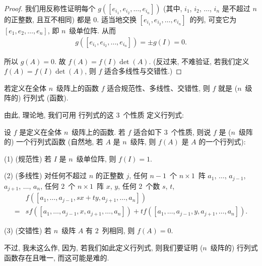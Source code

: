 \documentclass[../libro.tex]{subfiles}
\begin{document}
\begin{proof}
    我们用反称性证明每个
    \(g([e_{i_1}, e_{i_2}, \dots, e_{i_n}])\)
    (其中, \(i_1\), \(i_2\), \(\dots\), \(i_n\)
    是不超过 \(n\) 的正整数, 且互不相同)
    都是 \(0\).
    适当地交换
    \([e_{i_1}, e_{i_2}, \dots, e_{i_n}]\)~的列,
    可变它为 \([e_1, e_2, \dots, e_n]\),
    即 \(n\)~级单位阵.
    从而
    \begin{align*}
        g([e_{i_1}, e_{i_2}, \dots, e_{i_n}])
        = \pm g(I) = 0.
    \end{align*}

    所以 \(g(A) = 0\).
    故 \(f(A) = f(I) \det {(A)}\).
    (反过来, 不难验证, 若我们定义 %
    \(f(A) = f(I) \det {(A)}\),
    则 \(f\) 适合多线性与交错性.) %
\end{proof}

\begin{theorem}
    若定义在全体 \(n\)~级阵上的函数 \(f\)
    适合规范性、多线性、交错性,
    则 \(f\) 就是 (\(n\)~级阵的) 行列式 (函数).
\end{theorem}

由此, 理论地, 我们可用%
行列式的这 \(3\)~个性质%
定义行列式:

\begin{definition}
    设 \(f\) 是定义在全体 \(n\)~级阵上的函数.
    若 \(f\) 适合如下 \(3\)~个性质, 则说
    \(f\) 是 (\(n\)~级阵的) 一个行列式函数
    (自然地, 若 \(A\) 是 \(n\)~级阵,
    则 \(f(A)\) 是 \(A\) 的一个行列式):

    (1)
    (规范性)
    若 \(I\) 是 \(n\)~级单位阵,
    则 \(f(I) = 1\).

    (2)
    (多线性)
    对任何不超过 \(n\) 的正整数 \(j\),
    任何 \(n-1\)~个 \(n \times 1\)~阵
    \(a_1\), \(\dots\), \(a_{j-1}\),
    \(a_{j+1}\), \(\dots\), \(a_n\),
    任何 \(2\)~个 \(n \times 1\)~阵 \(x\), \(y\),
    任何 \(2\)~个数 \(s\), \(t\),
    \begin{align*}
        &
        f([a_1, \dots, a_{j-1}, sx + ty, a_{j+1}, \dots, a_n])
        \\
        = {} &
        s f([a_1, \dots, a_{j-1}, x, a_{j+1}, \dots, a_n])
        + t f([a_1, \dots, a_{j-1}, y, a_{j+1}, \dots, a_n]).
    \end{align*}

    (3)
    (交错性)
    若 \(n\)~级阵 \(A\) 有 \(2\)~列相同,
    则 \(f(A) = 0\).
\end{definition}

不过, 我未这么作,
因为, 若我们如此定义行列式,
则我们要证明 (\(n\)~级阵的) 行列式函数存在且唯一,
而这可能是难的.
\end{document}
